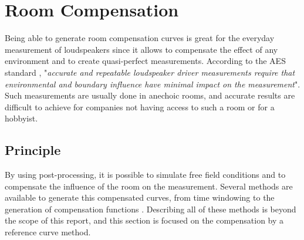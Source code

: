 \documentclass{report}
\begin{document}
\chapter{Room Compensation}

Being able to generate room compensation curves is great for the everyday measurement of loudspeakers since it allows to compensate the effect of any environment and to create quasi-perfect measurements. According to the AES standard \cite{aesstandart}, "\textit{accurate and repeatable loudspeaker driver measurements require that environmental and boundary influence have minimal impact on the measurement}". Such measurements are usually done in anechoic rooms, and accurate results are difficult to achieve for companies not having access to such a room or for a hobbyist.

\section{Principle}

By using post-processing, it is possible to simulate free field conditions and to compensate the influence of the room on the measurement. Several methods are available to generate this compensated curves, from time windowing to the generation of compensation functions \citep[see][]{aeswb}. Describing all of these methods is beyond the scope of this report, and this section is focused on the compensation by a reference curve method. \\
\end{document}
